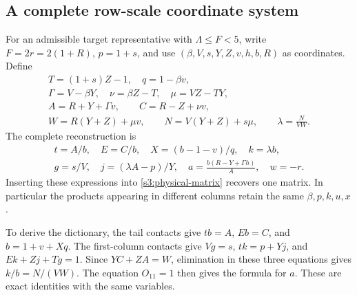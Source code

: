 \documentclass[11pt,reqno]{amsart}
\theoremstyle{definition}
\theoremstyle{remark}
\begin{document}
\subsection{A complete row-scale coordinate system}
\label{s3:scale-section}

For an admissible target representative with \(\Lambda\le F<5\), write \(F=2r=2(1+R)\), \(p=1+s\), and use
\((\beta,V,s,Y,Z,v,h,b,R)\) as coordinates. Define
\begin{equation}\label{s3:scale-aux}
\begin{gathered}
 T=(1+s)Z-1,\quad q=1-\beta v,\\
 \Gamma=V-\beta Y,\quad\nu=\beta Z-T,\quad\mu=VZ-TY,\\
 A=R+Y+\Gamma v,\qquad C=R-Z+\nu v,\\
 W=R(Y+Z)+\mu v,\qquad N=V(Y+Z)+s\mu,\qquad
 \lambda=\frac{N}{VW}.
\end{gathered}
\end{equation}
The complete reconstruction is
\begin{equation}\label{s3:scale-dictionary}
 \begin{gathered}
 t=A/b,\quad E=C/b,\quad X=(b-1-v)/q,\quad k=\lambda b,\\
 g=s/V,\quad j=(\lambda A-p)/Y,\quad
 a=\frac{b(R-Y+\Gamma h)}A,\quad w=-r.
 \end{gathered}
\end{equation}
Inserting these expressions into \eqref{s3:physical-matrix} recovers
one matrix. In particular the products appearing in different
columns retain the same \(\beta,p,k,u,x\).

To derive the dictionary, the tail contacts give
\(tb=A\), \(Eb=C\), and \(b=1+v+Xq\).
The first-column contacts give
\(Vg=s\), \(tk=p+Yj\), and \(Ek+Zj+Tg=1\).
Since \(YC+ZA=W\), elimination in these three equations gives
\(k/b=N/(VW)\). The equation \(O_{11}=1\) then gives the formula
for \(a\). These are exact identities with the same variables.
\end{document}
